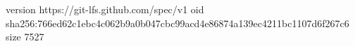 version https://git-lfs.github.com/spec/v1
oid sha256:766ed62c1ebc4c062b9a0b047cbc99acd4e86874a139ec4211bc1107d6f267c6
size 7527
